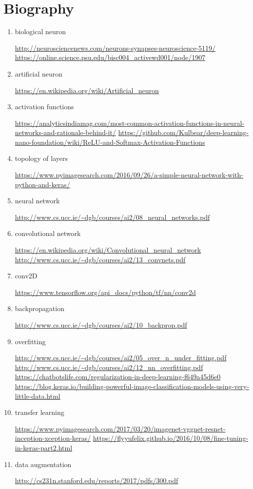 \documentclass[a4paper,10pt]{article}
\begin{document}
\section{Biography}
 \begin{enumerate}
	\item biological neuron
	
	\url{http://neurosciencenews.com/neurons-synapses-neuroscience-5119/}
	\url{https://online.science.psu.edu/bisc004_activewd001/node/1907}
	
	\item artificial neuron
	
	\url{https://en.wikipedia.org/wiki/Artificial_neuron}
	
	\item activation functions
	
	\url{https://analyticsindiamag.com/most-common-activation-functions-in-neural-networks-and-rationale-behind-it/}
	\url{https://github.com/Kulbear/deep-learning-nano-foundation/wiki/ReLU-and-Softmax-Activation-Functions}
	
	\item topology of layers
	 
	\url{https://www.pyimagesearch.com/2016/09/26/a-simple-neural-network-with-python-and-keras/}
	
	\item neural network
	
	\url{http://www.cs.ucc.ie/~dgb/courses/ai2/08_neural_networks.pdf}
	
	
	\item convolutional network
	
	\url{https://en.wikipedia.org/wiki/Convolutional_neural_network}
	\url{http://www.cs.ucc.ie/~dgb/courses/ai2/13_convnets.pdf}
	
	\item conv2D
	
	\url{https://www.tensorflow.org/api_docs/python/tf/nn/conv2d}
	
	\item backpropagation
	
	\url{http://www.cs.ucc.ie/~dgb/courses/ai2/10_backprop.pdf}
		
	\item overfitting
	
	\url{http://www.cs.ucc.ie/~dgb/courses/ai2/05_over_n_under_fitting.pdf}
	\url{http://www.cs.ucc.ie/~dgb/courses/ai2/12_nn_overfitting.pdf}
	\url{https://chatbotslife.com/regularization-in-deep-learning-f649a45d6e0}
	\url{https://blog.keras.io/building-powerful-image-classification-models-using-very-little-data.html}
		
	\item transfer learning
	
	\url{https://www.pyimagesearch.com/2017/03/20/imagenet-vggnet-resnet-inception-xception-keras/}
	\url{https://flyyufelix.github.io/2016/10/08/fine-tuning-in-keras-part2.html}
		
	\item data augmentation
	
	\url{http://cs231n.stanford.edu/reports/2017/pdfs/300.pdf}
		
	\end{enumerate}
\end{document}
